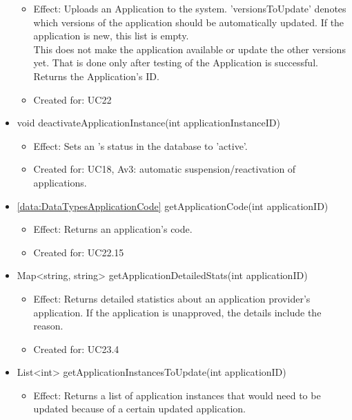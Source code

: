 \begin{description}
\begin{itemize}[noitemsep,nolistsep,leftmargin=-.25cm]
\begin{itemize}[noitemsep,nolistsep]
           \item Effect: Uploads an Application to the system. 'versionsToUpdate' denotes which versions of the application should be automatically updated. If the application is new, this list is empty. \\
This does not make the application available or update the other versions yet. That is done only after testing of the Application is successful. \\
Returns the Application's ID.
\item Created for: UC22
        \end{itemize}
      \item \textsf{void deactivateApplicationInstance(int applicationInstanceID)}
        \begin{itemize}[noitemsep,nolistsep]
           \item Effect: Sets an 's status in the database to 'active'.
\item Created for: UC18, Av3: automatic suspension/reactivation of applications.
        \end{itemize}
      \item \textsf{\ref{data:DataTypesApplicationCode} getApplicationCode(int applicationID)}
        \begin{itemize}[noitemsep,nolistsep]
           \item Effect: Returns an application's code.
\item Created for: UC22.15
        \end{itemize}
      \item \textsf{Map\textless{}string, string\textgreater{} getApplicationDetailedStats(int applicationID)}
        \begin{itemize}[noitemsep,nolistsep]
           \item Effect: Returns detailed statistics about an application provider's application. If the application is unapproved, the details include the reason.
\item Created for: UC23.4
        \end{itemize}
      \item \textsf{List\textless{}int\textgreater{} getApplicationInstancesToUpdate(int applicationID)}
        \begin{itemize}[noitemsep,nolistsep]
           \item Effect: Returns a list of application instances that would need to be updated because of a certain updated application.

\end{itemize}
\end{itemize}
\end{description}
